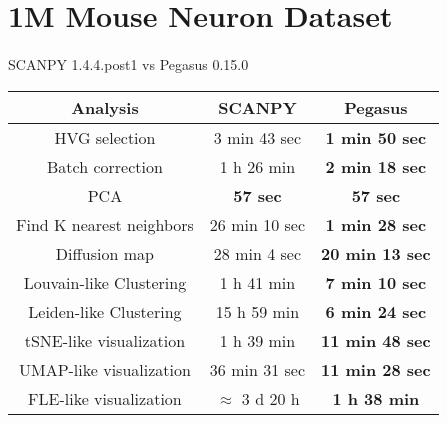 \documentclass[10pt]{article}
\begin{document}
\section{1M Mouse Neuron Dataset}

\paragraph{}
SCANPY 1.4.4.post1 \qquad vs \qquad Pegasus 0.15.0

\begin{table}[H]
	\centering
	\begin{tabular}{|c|c|c|}
		\hline
		Analysis  & SCANPY & Pegasus\\
		\hline \hline
		HVG selection  & 3 min 43 sec  & \textbf{1 min 50 sec}  \\
		\hline
		Batch correction  & 1 h 26 min  & \textbf{2 min 18 sec}  \\
		\hline
		PCA   & \textbf{57 sec}  & \textbf{57 sec}  \\
		\hline
		Find K nearest neighbors & 26 min 10 sec  & \textbf{1 min 28 sec}  \\
		\hline
		Diffusion map  & 28 min 4 sec  & \textbf{20 min 13 sec}  \\
		\hline
		Louvain-like Clustering  & 1 h 41 min  & \textbf{7 min 10 sec}  \\
		\hline
		Leiden-like Clustering & 15 h 59 min  & \textbf{6 min 24 sec}  \\
		\hline
		tSNE-like visualization & 1 h 39 min  & \textbf{11 min 48 sec}  \\
		\hline
		UMAP-like visualization & 36 min 31 sec   & \textbf{11 min 28 sec}  \\
		\hline
		FLE-like visualization  & $\approx$ 3 d 20 h  & \textbf{1 h 38 min}  \\
		\hline
	\end{tabular}
\end{table}
\end{document}
